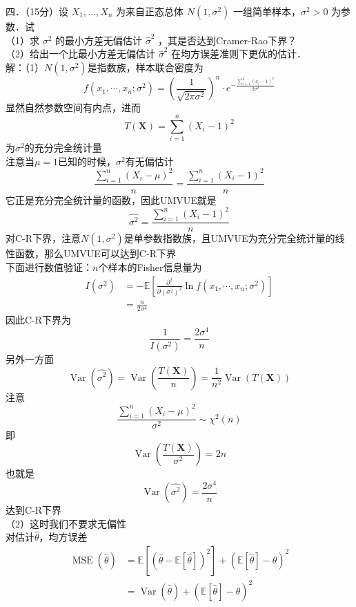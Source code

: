 \documentclass[UTF8]{ctexart}
\begin{document}
\noindent 四．（15分）设 $X_1, \ldots, X_n$ 为来自正态总体 $N\left(1, \sigma^2\right)$ 一组简单样本，$\sigma^2>0$ 为参数．试\\
（1）求 $\sigma^2$ 的最小方差无偏估计 $\hat{\sigma}^2$ ，其是否达到Cramer-Rao下界？\\
（2）给出一个比最小方差无偏估计 $\hat{\sigma}^2$ 在均方误差准则下更优的估计．\\
解：（1）$N\left(1, \sigma^2\right)$是指数族，样本联合密度为
\[
f\left(x_1, \cdots, x_n ; \sigma^2\right)=\left(\frac{1}{\sqrt{2 \pi \sigma^2}}\right)^n \cdot e^{-\frac{\sum\limits_{i=1}^n \left(x_{i}-1\right)^2}{2 \sigma^2}}
\]
显然自然参数空间有内点，进而
\[
T(\boldsymbol{X})=\sum\limits_{i=1}^n \left(X_{i}-1\right)^2
\]
为$\sigma^2$的充分完全统计量\\
注意当$\mu=1$已知的时候，$\sigma^2$有无偏估计
\[
\frac{\sum\limits_{i=1}^n\left(X_i-\mu\right)^2}{n}=\frac{\sum\limits_{i=1}^n\left(X_i-1\right)^2}{n}
\]
它正是充分完全统计量的函数，因此UMVUE就是
\[
\hat{\sigma^2}=\frac{\sum\limits_{i=1}^n\left(X_i-1\right)^2}{n}
\]
对C-R下界，注意$N\left(1, \sigma^2\right)$是单参数指数族，且UMVUE为充分完全统计量的线性函数，那么UMVUE可以达到C-R下界\\
下面进行数值验证：$n$个样本的Fisher信息量为
\[
\begin{aligned}
	I\left(\sigma^2\right) & =-\mathbb{E}\left[\frac{\partial^2}{\partial \left(\sigma^2\right)^2} \ln f\left(x_1, \cdots, x_n ; \sigma^2\right)\right] \\
	& =\frac{n}{2 \sigma^4} 
\end{aligned}
\]
因此C-R下界为
\[
\frac{1}{I\left(\sigma^2\right)}=\frac{2 \sigma^4}{n} 
\]
另外一方面
\[
\operatorname{Var}\left(\hat{\sigma^2}\right)=\operatorname{Var}\left(\frac{T(\boldsymbol{X})}{n}\right)=\frac{1}{n^2} \operatorname{Var}(T(\boldsymbol{X}))
\]
注意
\[
\frac{\sum\limits_{i=1}^n\left(X_i-\mu\right)^2}{\sigma^2} \sim \chi^2(n)
\]
即
\[
\operatorname{Var}\left(\frac{T(\boldsymbol{X})}{\sigma^2}\right)=2n
\]
也就是
\[
\operatorname{Var}\left(\hat{\sigma^2}\right)=\frac{2 \sigma^4}{n} 
\]
达到C-R下界\\
（2）这时我们不要求无偏性\\
对估计$\hat{\theta}$，均方误差
\[
\begin{aligned}
	\operatorname{MSE}(\hat{\theta}) & =\mathbb{E}\left[(\hat{\theta}-\mathbb{E}[\hat{\theta}])^2\right]+(\mathbb{E}[\hat{\theta}]-\theta)^2 \\
	& =\operatorname{Var}(\hat{\theta})+(\mathbb{E}[\hat{\theta}]-\theta)^2
\end{aligned}
\]
\end{document}
